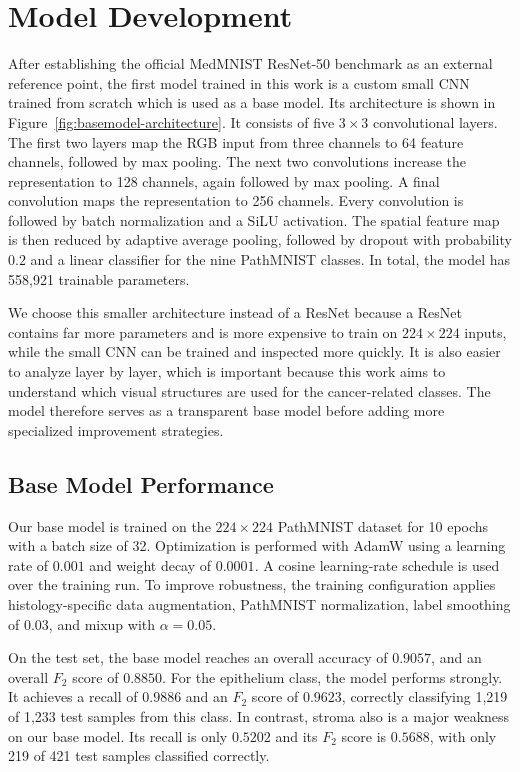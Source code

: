 \section{Model Development}

After establishing the official MedMNIST ResNet-50 benchmark as an external
reference point, the first model trained in this work is a custom small CNN
trained from scratch which is used as a base model. Its architecture is shown
in Figure~\ref{fig:basemodel-architecture}. It consists of five
$3 \times 3$ convolutional layers. The first two layers map the RGB input from
three channels to 64 feature channels, followed by max pooling. The next two
convolutions increase the representation to 128 channels, again followed by max
pooling. A final convolution maps the representation to 256 channels. Every
convolution is followed by batch normalization and a SiLU activation. The
spatial feature map is then reduced by adaptive average pooling, followed by
dropout with probability $0.2$ and a linear classifier for the nine PathMNIST
classes. In total, the model has 558,921 trainable parameters.


We choose this smaller architecture instead of a ResNet because a ResNet
contains far more parameters and is more expensive to train on $224 \times 224$
inputs, while the small CNN can be trained and inspected more quickly. It is
also easier to analyze layer by layer, which is important because this work aims
to understand which visual structures are used for the cancer-related classes.
The model therefore serves as a transparent base model before adding more
specialized improvement strategies.

\subsection{Base Model Performance}
Our base model is trained on the $224 \times 224$ PathMNIST dataset for 10
epochs with a batch size of 32. Optimization is performed with AdamW using a
learning rate of $0.001$ and weight decay of $0.0001$. A cosine learning-rate
schedule is used over the training run. To improve robustness, the training
configuration applies histology-specific data augmentation, PathMNIST
normalization, label smoothing of $0.03$, and mixup with $\alpha = 0.05$.

On the test set, the base model reaches an overall accuracy of $0.9057$, and an
overall $F_2$ score of $0.8850$. For the epithelium class, the model performs
strongly. It achieves a recall of $0.9886$ and an $F_2$ score of $0.9623$,
correctly classifying 1,219 of 1,233 test samples from this class. In contrast,
stroma also is a major weakness on our base model. Its recall is only $0.5202$
and its $F_2$ score is $0.5688$, with only 219 of 421 test samples classified
correctly.

